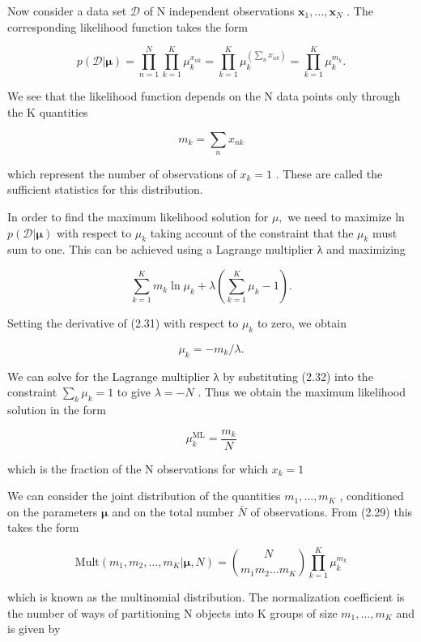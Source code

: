 \documentclass[
  10
]{article}
\begin{document}
Now consider a data set \(\mathcal { D }\) of N independent observations
\(\mathbf { x } _ { 1 } , \ldots , \mathbf { x } _ { N }\) . The
corresponding likelihood function takes the form

\[
p (\mathcal {D} | \boldsymbol {\mu}) = \prod_ {n = 1} ^ {N} \prod_ {k = 1} ^ {K} \mu_ {k} ^ {x _ {n k}} = \prod_ {k = 1} ^ {K} \mu_ {k} ^ {\left(\sum_ {n} x _ {n k}\right)} = \prod_ {k = 1} ^ {K} \mu_ {k} ^ {m _ {k}}.\tag{2.29}
\]

We see that the likelihood function depends on the N data points only
through the K quantities

\[
m _ {k} = \sum_ {n} x _ {n k}\tag{2.30}
\]

which represent the number of observations of \(x _ { k } = 1\) . These
are called the sufficient statistics for this distribution.

In order to find the maximum likelihood solution for \(\mu ,\) we need
to maximize ln \(p ( \mathcal { D } | \boldsymbol { \mu } )\) with
respect to \(\mu _ { k }\) taking account of the constraint that the
\(\mu _ { k }\) must sum to one. This can be achieved using a Lagrange
multiplier λ and maximizing

\[
\sum_ {k = 1} ^ {K} m _ {k} \ln \mu_ {k} + \lambda \left(\sum_ {k = 1} ^ {K} \mu_ {k} - 1\right).\tag{2.31}
\]

Setting the derivative of (2.31) with respect to \(\mu _ { k }\) to
zero, we obtain

\[
\mu_ {k} = - m _ {k} / \lambda .\tag{2.32}
\]

We can solve for the Lagrange multiplier λ by substituting (2.32) into
the constraint \(\textstyle \sum _ { k } \mu _ { k } = 1\) to give
\(\lambda = - N\) . Thus we obtain the maximum likelihood solution in
the form

\[
\mu_ {k} ^ {\mathrm{ML}} = \frac {m _ {k}}{N}\tag{2.33}
\]

which is the fraction of the N observations for which \(x _ { k } = 1\)

We can consider the joint distribution of the quantities
\(m _ { 1 } , \ldots , m _ { K }\) , conditioned on the parameters
\(\pmb { \mu }\) and on the total number \(\bar { N }\) of observations.
From (2.29) this takes the form

\[
\mathrm{Mult} (m _ {1}, m _ {2}, \ldots , m _ {K} | \boldsymbol {\mu}, N) = \binom {N} {m _ {1} m _ {2} \ldots m _ {K}} \prod_ {k = 1} ^ {K} \mu_ {k} ^ {m _ {k}}\tag{2.34}
\]

which is known as the multinomial distribution. The normalization
coefficient is the number of ways of partitioning N objects into K
groups of size \(m _ { 1 } , \ldots , m _ { K }\) and is given by
\end{document}
